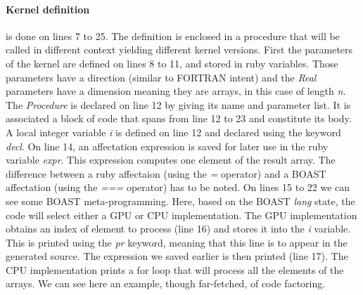 \paragraph{Kernel definition} is done on lines 7 to 25.
The definition is enclosed in a procedure that will be called in different context yielding different kernel versions.
First the parameters of the kernel are defined on lines 8 to 11, and stored in ruby variables.
Those parameters have a direction (similar to FORTRAN intent) and the \emph{Real} parameters have a dimension meaning they are arrays, in this case of length \emph{n}.
The \emph{Procedure} is declared on line 12 by giving its name and parameter list.
It is associated a block of code that spans from line 12 to 23 and constitute its body.
A local integer variable \emph{i} is defined on line 12 and declared using the keyword \emph{decl}.
On line 14, an affectation expression is saved for later use in the ruby variable \emph{expr}.
This expression computes one element of the result array.
The difference between a ruby affectaion (using the \emph{=} operator) and a BOAST affectation (using the \emph{===} operator) has to be noted.
On lines 15 to 22 we can see some BOAST meta-programming.
Here, based on the BOAST \emph{lang} state, the code will select either a GPU or CPU implementation.
The GPU implementation obtains an index of element to process (line 16) and stores it into the \emph{i} variable.
This is printed using the \emph{pr} keyword, meaning that this line is to appear in the generated source.
The expression we saved earlier is then printed (line 17).
The CPU implementation prints a for loop that will process all the elements of the arrays.
We can see here an example, though far-fetched, of code factoring.

